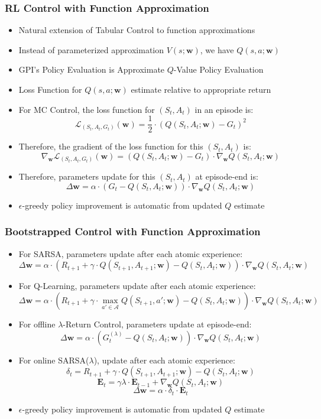 \documentclass[handout]{beamer}
\begin{document}
\begin{frame}
\frametitle{RL Control with Function Approximation}
\pause
\begin{itemize}[<+->]
\item Natural extension of Tabular Control to function approximations
\item Instead of parameterized approximation $V(s; \bm{w})$, we have $Q(s,a;\bm{w})$
\item GPI's Policy Evaluation is Approximate $Q$-Value Policy Evaluation
\item Loss Function for $Q(s,a;\bm{w})$ estimate relative to appropriate return
\item For MC Control, the loss function for $(S_t,A_t)$ in an episode is:
$$\mathcal{L}_{(S_t,A_t,G_t)}(\bm{w}) = \frac 1 2 \cdot (Q(S_t,A_t;\bm{w}) - G_t)^2$$
\item Therefore, the gradient of the loss function for this $(S_t,A_t)$ is:
$$\nabla_{\bm{w}} \mathcal{L}_{(S_t,A_t,G_t)}(\bm{w}) = (Q(S_t,A_t;\bm{w}) - G_t) \cdot \nabla_{\bm{w}} Q(S_t,A_t;\bm{w})$$
\item Therefore, parameters update for this $(S_t,A_t)$ at episode-end is:
$$\Delta \bm{w} = \alpha \cdot (G_t - Q(S_t,A_t;\bm{w})) \cdot \nabla_{\bm{w}} Q(S_t,A_t;\bm{w})$$
\item $\epsilon$-greedy policy improvement is automatic from updated $Q$ estimate
\end{itemize}
\end{frame}

\begin{frame}
\frametitle{Bootstrapped Control with Function Approximation}
\pause
\begin{itemize}[<+->]
\item For SARSA, parameters update after each atomic experience:
$$\Delta \bm{w} = \alpha \cdot (R_{t+1} + \gamma \cdot Q(S_{t+1},A_{t+1};\bm{w}) - Q(S_t,A_t;\bm{w})) \cdot \nabla_{\bm{w}} Q(S_t,A_t;\bm{w})$$
\item For Q-Learning, parameters update after each atomic experience:
$$\Delta \bm{w} = \alpha \cdot (R_{t+1} + \gamma \cdot \max_{a' \in \mathcal{A}} Q(S_{t+1},a';\bm{w}) - Q(S_t,A_t;\bm{w})) \cdot \nabla_{\bm{w}} Q(S_t,A_t;\bm{w})$$
\item For offline $\lambda$-Return Control, parameters update at episode-end:
$$\Delta \bm{w} = \alpha \cdot (G_t^{(\lambda)} - Q(S_t,A_t;\bm{w})) \cdot \nabla_{\bm{w}} Q(S_t,A_t;\bm{w})$$
\item For online SARSA($\lambda$), update after each atomic experience:
$$\delta_t = R_{t+1} + \gamma \cdot Q(S_{t+1},A_{t+1};\bm{w}) - Q(S_t,A_t;\bm{w})$$
$$\bm{E}_t = \gamma \lambda \cdot \bm{E}_{t-1} + \nabla_{\bm{w}} Q(S_t,A_t;\bm{w})$$
$$\Delta \bm{w} = \alpha \cdot \delta_t \cdot \bm{E}_t$$
\item $\epsilon$-greedy policy improvement is automatic from updated $Q$ estimate
\end{itemize}
\end{frame}
\end{document}
